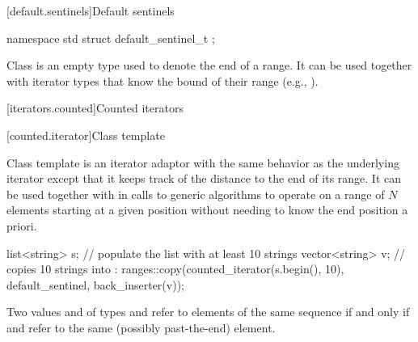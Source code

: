[default.sentinels]{Default sentinels}

%
\begin{itemdecl}
namespace std {
  struct default_sentinel_t { };
}
\end{itemdecl}

\pnum
Class  is an empty type used to denote the end of a
range. It can be used together with iterator types that know the bound
of their range (e.g., ).

[iterators.counted]{Counted iterators}

[counted.iterator]{Class template }

\pnum
Class template  is an iterator adaptor
with the same behavior as the underlying iterator except that
it keeps track of the distance to the end of its range.
It can be used together with 
in calls to generic algorithms to operate on
a range of $N$ elements starting at a given position
without needing to know the end position a priori.

\pnum
\begin{example}
\begin{codeblock}
list<string> s;
// populate the list  with at least 10 strings
vector<string> v;
// copies 10 strings into :
ranges::copy(counted_iterator(s.begin(), 10), default_sentinel, back_inserter(v));
\end{codeblock}
\end{example}

\pnum
Two values  and  of types
and
refer to elements of the same sequence if and only if
and
refer to the same (possibly past-the-end) element.

